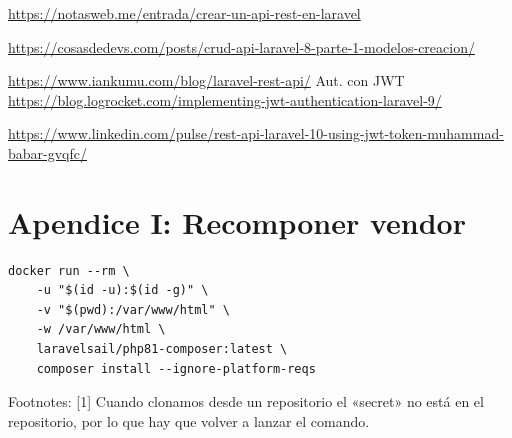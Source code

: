 \documentclass[11pt]{article}
\begin{document}
\url{https://notasweb.me/entrada/crear-un-api-rest-en-laravel}

\url{https://cosasdedevs.com/posts/crud-api-laravel-8-parte-1-modelos-creacion/}

\url{https://www.iankumu.com/blog/laravel-rest-api/}
Aut. con JWT
\url{https://blog.logrocket.com/implementing-jwt-authentication-laravel-9/}

\url{https://www.linkedin.com/pulse/rest-api-laravel-10-using-jwt-token-muhammad-babar-gvqfc/}


\section{Apendice I: Recomponer vendor}
\label{sec:orgce70cac}
\begin{verbatim}
docker run --rm \
    -u "$(id -u):$(id -g)" \
    -v "$(pwd):/var/www/html" \
    -w /var/www/html \
    laravelsail/php81-composer:latest \
    composer install --ignore-platform-reqs

\end{verbatim}


Footnotes:
[1] Cuando clonamos desde un repositorio el «secret» no está en el
repositorio, por lo que hay que volver a lanzar el comando.
\end{document}
